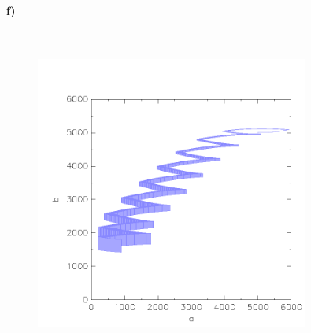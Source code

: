 \paragraph{f)}\mbox{} \\

\begin{figure}[H]
	\centering
	\includegraphics[width=0.8\textwidth]{Aufgabe_f).png}
\end{figure}

